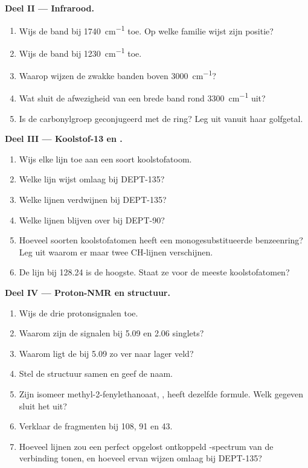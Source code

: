 \begin{problem}
\medskip
\noindent\textbf{Deel II --- Infrarood.}
\begin{enumerate}[resume]
  \item Wijs de band bij \qty{1740}{cm^{-1}} toe. Op welke familie wijst zijn positie?
  \item Wijs de band bij \qty{1230}{cm^{-1}} toe.
  \item Waarop wijzen de zwakke banden boven \qty{3000}{cm^{-1}}?
  \item Wat sluit de afwezigheid van een brede band rond \qty{3300}{cm^{-1}} uit?
  \item Is de carbonylgroep geconjugeerd met de ring? Leg uit vanuit haar golfgetal.
\end{enumerate}

\medskip
\noindent\textbf{Deel III --- Koolstof-13 en .}
\begin{enumerate}[resume]
  \item Wijs elke lijn toe aan een soort koolstofatoom.
  \item Welke lijn wijst omlaag bij DEPT-135?
  \item Welke lijnen verdwijnen bij DEPT-135?
  \item Welke lijnen blijven over bij DEPT-90?
  \item Hoeveel soorten koolstofatomen heeft een monogesubstitueerde benzeenring? Leg uit waarom er maar twee 
        CH-lijnen verschijnen.
  \item De lijn bij 128.24 is de hoogste. Staat ze voor de meeste koolstofatomen?
\end{enumerate}

\medskip
\noindent\textbf{Deel IV --- Proton-NMR en structuur.}
\begin{enumerate}[resume]
  \item Wijs de drie protonsignalen toe.
  \item Waarom zijn de signalen bij 5.09 en 2.06 singlets?
  \item Waarom ligt de  bij 5.09 zo ver naar lager veld?
  \item Stel de structuur samen en geef de naam.
  \item Zijn isomeer methyl-2-fenylethanoaat, , heeft dezelfde formule. Welk gegeven sluit het
        uit?
  \item Verklaar de fragmenten bij 108, 91 en 43.
  \item Hoeveel lijnen zou een perfect opgelost ontkoppeld -spectrum van de verbinding tonen, en
        hoeveel ervan wijzen omlaag bij DEPT-135?
\end{enumerate}
\end{problem}

